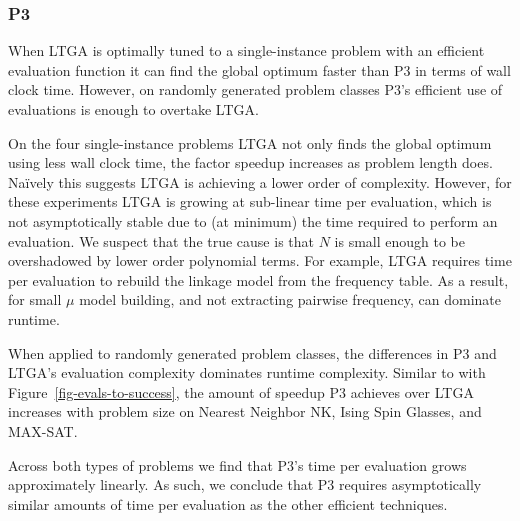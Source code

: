 \subsubsection{P3}
When LTGA is optimally tuned to a single-instance problem with an efficient evaluation function
it can find the global optimum faster than P3 in terms of wall clock time. However, on randomly
generated problem classes P3's efficient use of evaluations is enough to overtake LTGA.

On the four single-instance problems LTGA not only finds the global optimum using less wall clock time,
the factor speedup increases as problem length does. Na\"{i}vely this suggests LTGA is achieving
a lower order of complexity. However, for these experiments LTGA is growing at sub-linear time per
evaluation, which is not asymptotically stable due to (at minimum) the time required to perform an evaluation.
We suspect that the true cause is that $N$ is small enough to be overshadowed by lower order polynomial terms.
For example, LTGA requires  time per evaluation to rebuild the linkage
model from the frequency table. As a result, for small $\mu$ model building, and not extracting pairwise
frequency, can dominate runtime.

When applied to randomly generated problem classes, the differences in P3 and LTGA's evaluation complexity
dominates runtime complexity. Similar to with Figure~\ref{fig-evals-to-success}, the amount of speedup P3
achieves over LTGA increases with problem size on Nearest Neighbor NK, Ising Spin Glasses, and MAX-SAT.

Across both types of problems we find that P3's time per evaluation grows approximately linearly. As such,
we conclude that P3 requires asymptotically similar amounts of time per evaluation as the other efficient techniques.

